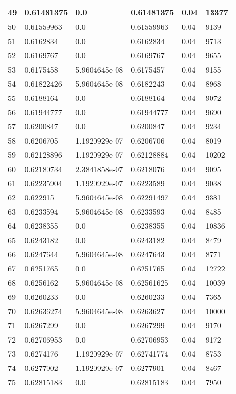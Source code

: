 \begin{longtable}{|l|l|l|l|l|l|}
49 & 0.61481375 & 0.0 & 0.61481375 & 0.04 & 13377 \\ \hline 
50 & 0.61559963 & 0.0 & 0.61559963 & 0.04 & 9139 \\ \hline 
51 & 0.6162834 & 0.0 & 0.6162834 & 0.04 & 9713 \\ \hline 
52 & 0.6169767 & 0.0 & 0.6169767 & 0.04 & 9655 \\ \hline 
53 & 0.6175458 & 5.9604645e-08 & 0.6175457 & 0.04 & 9155 \\ \hline 
54 & 0.61822426 & 5.9604645e-08 & 0.6182243 & 0.04 & 8968 \\ \hline 
55 & 0.6188164 & 0.0 & 0.6188164 & 0.04 & 9072 \\ \hline 
56 & 0.61944777 & 0.0 & 0.61944777 & 0.04 & 9690 \\ \hline 
57 & 0.6200847 & 0.0 & 0.6200847 & 0.04 & 9234 \\ \hline 
58 & 0.6206705 & 1.1920929e-07 & 0.6206706 & 0.04 & 8019 \\ \hline 
59 & 0.62128896 & 1.1920929e-07 & 0.62128884 & 0.04 & 10202 \\ \hline 
60 & 0.62180734 & 2.3841858e-07 & 0.6218076 & 0.04 & 9095 \\ \hline 
61 & 0.62235904 & 1.1920929e-07 & 0.6223589 & 0.04 & 9038 \\ \hline 
62 & 0.622915 & 5.9604645e-08 & 0.62291497 & 0.04 & 9381 \\ \hline 
63 & 0.6233594 & 5.9604645e-08 & 0.6233593 & 0.04 & 8485 \\ \hline 
64 & 0.6238355 & 0.0 & 0.6238355 & 0.04 & 10836 \\ \hline 
65 & 0.6243182 & 0.0 & 0.6243182 & 0.04 & 8479 \\ \hline 
66 & 0.6247644 & 5.9604645e-08 & 0.6247643 & 0.04 & 8771 \\ \hline 
67 & 0.6251765 & 0.0 & 0.6251765 & 0.04 & 12722 \\ \hline 
68 & 0.6256162 & 5.9604645e-08 & 0.62561625 & 0.04 & 10039 \\ \hline 
69 & 0.6260233 & 0.0 & 0.6260233 & 0.04 & 7365 \\ \hline 
70 & 0.62636274 & 5.9604645e-08 & 0.6263627 & 0.04 & 10000 \\ \hline 
71 & 0.6267299 & 0.0 & 0.6267299 & 0.04 & 9170 \\ \hline 
72 & 0.62706953 & 0.0 & 0.62706953 & 0.04 & 9172 \\ \hline 
73 & 0.6274176 & 1.1920929e-07 & 0.62741774 & 0.04 & 8753 \\ \hline 
74 & 0.6277902 & 1.1920929e-07 & 0.6277901 & 0.04 & 8467 \\ \hline 
75 & 0.62815183 & 0.0 & 0.62815183 & 0.04 & 7950 \\ \hline 
\end{longtable}